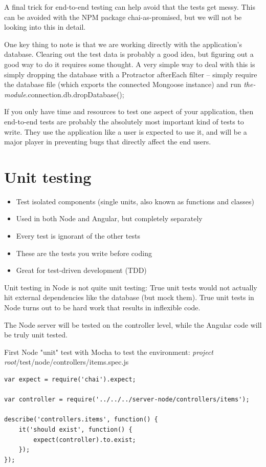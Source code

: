 \documentclass[british]{article}
\begin{document}
A final trick for end-to-end testing can help avoid that the tests get messy. This can be avoided with the NPM package chai-as-promised, but we will not be looking into this in detail.

One key thing to note is that we are working directly with the application's database. Clearing out the test data is probably a good idea, but figuring out a good way to do it requires some thought. A very simple way to deal with this is simply dropping the database with a Protractor afterEach filter -- simply require the database file (which exports the connected Mongoose instance) and run \textit{the-module}.connection.db.dropDatabase();

If you only have time and resources to test one aspect of your application, then end-to-end tests are probably the absolutely most important kind of tests to write. They use the application like a user is expected to use it, and will be a major player in preventing bugs that directly affect the end users.

\section{Unit testing}

\begin{itemize}
  \item Test isolated components (single units, also known as functions and classes)
  \item Used in both Node and Angular, but completely separately
  \item Every test is ignorant of the other tests
  \item These are the tests you write before coding
  \item Great for test-driven development (TDD)
\end{itemize}

Unit testing in Node is not quite unit testing: True unit tests would not actually hit external dependencies like the database (but mock them). True unit tests in Node turns out to be hard work that results in inflexible code.

The Node server will be tested on the controller level, while the Angular code will be truly unit tested.

First Node "unit" test with Mocha to test the environment: \textit{project root}/test/node/controllers/items.spec.js

\begin{lstlisting}
var expect = require('chai').expect;

var controller = require('../../../server-node/controllers/items');

describe('controllers.items', function() {
	it('should exist', function() {
		expect(controller).to.exist;
	});
});
\end{lstlisting}
\end{document}
